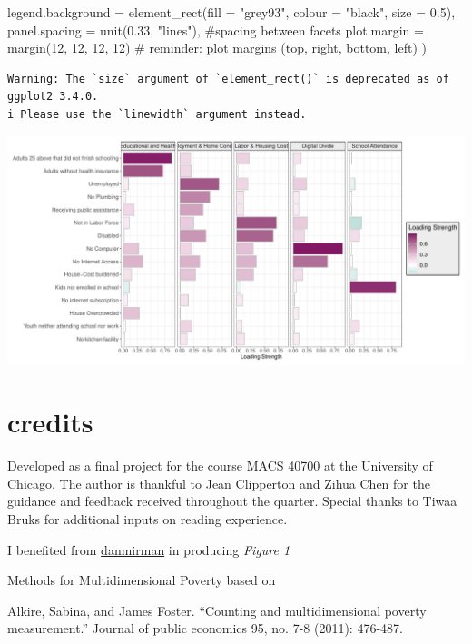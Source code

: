 \documentclass[
  letterpaper,
  DIV=11,
  numbers=noendperiod]{scrreprt}
\newenvironment{Shaded}{\begin{snugshade}}{\end{snugshade}}
\newcommand{\AttributeTok}[1]{\textcolor[rgb]{0.40,0.45,0.13}{#1}}
\newcommand{\CommentTok}[1]{\textcolor[rgb]{0.37,0.37,0.37}{#1}}
\newcommand{\DecValTok}[1]{\textcolor[rgb]{0.68,0.00,0.00}{#1}}
\newcommand{\FloatTok}[1]{\textcolor[rgb]{0.68,0.00,0.00}{#1}}
\newcommand{\FunctionTok}[1]{\textcolor[rgb]{0.28,0.35,0.67}{#1}}
\newcommand{\NormalTok}[1]{\textcolor[rgb]{0.00,0.23,0.31}{#1}}
\newcommand{\StringTok}[1]{\textcolor[rgb]{0.13,0.47,0.30}{#1}}
\begin{document}
\begin{Shaded}
\begin{Highlighting}[]
    \AttributeTok{legend.background =} \FunctionTok{element\_rect}\NormalTok{(}\AttributeTok{fill =} \StringTok{"grey93"}\NormalTok{, }\AttributeTok{colour =} \StringTok{"black"}\NormalTok{, }\AttributeTok{size =} \FloatTok{0.5}\NormalTok{),}
    \AttributeTok{panel.spacing =} \FunctionTok{unit}\NormalTok{(}\FloatTok{0.33}\NormalTok{, }\StringTok{"lines"}\NormalTok{), }\CommentTok{\#spacing between facets}
    \AttributeTok{plot.margin =} \FunctionTok{margin}\NormalTok{(}\DecValTok{12}\NormalTok{, }\DecValTok{12}\NormalTok{, }\DecValTok{12}\NormalTok{, }\DecValTok{12}\NormalTok{) }\CommentTok{\# reminder: plot margins (top, right, bottom, left)}
\NormalTok{  )}
\end{Highlighting}
\end{Shaded}

\begin{verbatim}
Warning: The `size` argument of `element_rect()` is deprecated as of ggplot2 3.4.0.
i Please use the `linewidth` argument instead.
\end{verbatim}

\includegraphics{multidimensional_poverty_files/figure-pdf/viz1-1.pdf}


\chapter{credits}\label{credits}

Developed as a final project for the course MACS 40700 at the University
of Chicago. The author is thankful to Jean Clipperton and Zihua Chen for
the guidance and feedback received throughout the quarter. Special
thanks to Tiwaa Bruks for additional inputs on reading experience.

I benefited from
\href{https://rpubs.com/danmirman/plotting_factor_analysis}{danmirman}
in producing \emph{Figure 1}

Methods for Multidimensional Poverty based on

Alkire, Sabina, and James Foster. ``Counting and multidimensional
poverty measurement.'' Journal of public economics 95, no. 7-8 (2011):
476-487.
\end{document}
